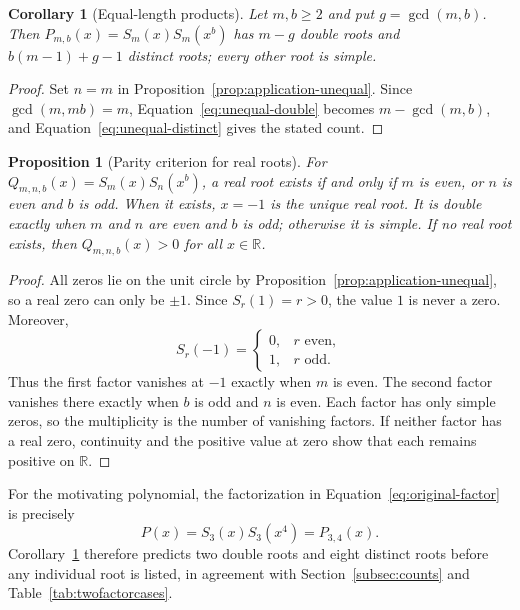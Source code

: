 \documentclass[11pt,a4paper]{article}
\numberwithin{equation}{section}
\theoremstyle{uprightpaper}
\newtheorem{proposition}{Proposition}[section]
\newtheorem{corollary}{Corollary}[section]
\newcommand{\R}{\mathbb{R}}
\begin{document}
\begin{corollary}[Equal-length products]\label{cor:application-count}
Let $m,b\ge2$ and put $g=\gcd(m,b)$. Then $P_{m,b}(x)=S_m(x)S_m(x^b)$ has $m-g$ double roots and $b(m-1)+g-1$ distinct roots; every other root is simple.
\end{corollary}
\begin{proof}
Set $n=m$ in Proposition~\ref{prop:application-unequal}. Since $\gcd(m,mb)=m$, Equation~\eqref{eq:unequal-double} becomes $m-\gcd(m,b)$, and Equation~\eqref{eq:unequal-distinct} gives the stated count.
\end{proof}

\begin{proposition}[Parity criterion for real roots]\label{prop:real-parity}
For $Q_{m,n,b}(x)=S_m(x)S_n(x^b)$, a real root exists if and only if $m$ is even, or $n$ is even and $b$ is odd. When it exists, $x=-1$ is the unique real root. It is double exactly when $m$ and $n$ are even and $b$ is odd; otherwise it is simple. If no real root exists, then $Q_{m,n,b}(x)>0$ for all $x\in\R$.
\end{proposition}
\begin{proof}
All zeros lie on the unit circle by Proposition~\ref{prop:application-unequal}, so a real zero can only be $\pm1$. Since $S_r(1)=r>0$, the value $1$ is never a zero. Moreover,
\begin{equation}\label{eq:parity-sum}
 S_r(-1)=\begin{cases}0,&r\text{ even},\\1,&r\text{ odd}.\end{cases}
\end{equation}
Thus the first factor vanishes at $-1$ exactly when $m$ is even. The second factor vanishes there exactly when $b$ is odd and $n$ is even. Each factor has only simple zeros, so the multiplicity is the number of vanishing factors. If neither factor has a real zero, continuity and the positive value at zero show that each remains positive on $\R$.
\end{proof}

For the motivating polynomial, the factorization in Equation~\eqref{eq:original-factor} is precisely
\begin{equation}\label{eq:original-family}
 P(x)=S_3(x)S_3(x^4)=P_{3,4}(x).
\end{equation}
Corollary~\ref{cor:application-count} therefore predicts two double roots and eight distinct roots before any individual root is listed, in agreement with Section~\ref{subsec:counts} and Table~\ref{tab:twofactorcases}.
\end{document}
